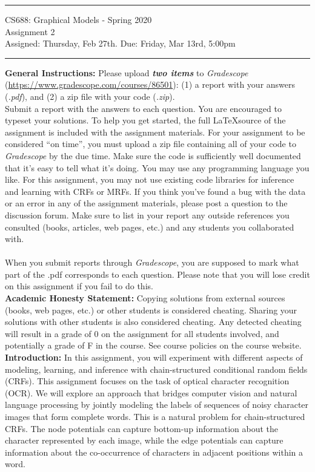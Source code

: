 \documentclass[11pt]{article}
\begin{document}
{\centering \rule{6.3in}{2pt} \vspace{1em} {\Large CS688: Graphical Models -
Spring 2020\\ Assignment 2\\ } \vspace{1em}
Assigned: Thursday, Feb 27th. Due: Friday, Mar 13rd, 5:00pm\\ \vspace{0.1em} \rule{6.3in}{1.5pt}
}\vspace{1em}


\textbf{General Instructions:} 
Please upload {\em\bf two items} to \textit{Gradescope} (\url{https://www.gradescope.com/courses/86501}): (1) a report with your answers (\textit{.pdf}), and (2) a zip file with your code (\textit{.zip}).\\
Submit a report with the answers to each question. You are encouraged to typeset your solutions. 
To help you get started, the full \LaTeX source of the assignment is included with the assignment materials. For your assignment to be considered ``on time'', you must upload a zip file containing all of your code to \textit{Gradescope} by the due time.
Make sure the code is sufficiently well documented that it's easy to tell what it's doing. You may use any programming language you like. For this assignment, you may not use
existing code libraries for inference and learning with CRFs or MRFs. If you
think you've found a bug with the data or an error in any of the assignment
materials, please post a question to the discussion forum. Make sure to
list in your report any outside references you consulted (books, articles, web
pages, etc.) and any students you collaborated with.\\ \\
When you submit reports through \textit{Gradescope}, you are supposed to mark what part of the .pdf corresponds to each question. Please note that you will lose credit on this assignment if you fail to do this. \\

\textbf{Academic Honesty Statement:} Copying solutions from external sources
(books, web pages, etc.) or other students is considered cheating. Sharing your
solutions with other students is also considered cheating. Any detected
cheating will result in a grade of 0 on the assignment for all students
involved, and potentially a grade of F in the course. See course policies on the course website.\\

\textbf{Introduction:} In this assignment, you will experiment with different
aspects of modeling, learning, and inference with chain-structured conditional
random fields (CRFs). This assignment focuses on the task of optical character
recognition (OCR). We will explore an approach that bridges computer vision and
natural language processing by jointly modeling the labels of sequences of
noisy character images that form complete words. This is a natural problem for
chain-structured CRFs. The node potentials can capture bottom-up information
about the character represented by each image, while the edge potentials can
capture information about the co-occurrence of characters in adjacent positions
within a word.  \\
\end{document}
